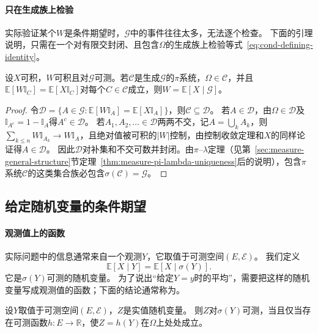 \paragraph{只在生成族上检验}
实际验证某个$W$是条件期望时，$\mathcal G$中的事件往往太多，无法逐个检查。
下面的引理说明，只需在一个对有限交封闭、且包含$\Omega$的生成族上检验等式~\eqref{eq:cond-defining-identity}。

\begin{lemma}[生成族上的检验]
\label{lem:cond-pi-check}
设$X$可积，$W$可积且对$\mathcal G$可测。若$\mathcal C$是生成$\mathcal G$的$\pi$系统，$\Omega\in\mathcal C$，并且$\mathbb E[W\mathbb I_C]=\mathbb E[X\mathbb I_C]$对每个$C\in\mathcal C$成立，则$W=\mathbb E[X\mid\mathcal G]$。
\end{lemma}

\begin{proof}
令$\mathcal D=\{A\in\mathcal G:\mathbb E[W\mathbb I_A]=\mathbb E[X\mathbb I_A]\}$，则$\mathcal C\subseteq\mathcal D$。
若$A\in\mathcal D$，由$\Omega\in\mathcal D$及$\mathbb I_{A^c}=1-\mathbb I_A$得$A^c\in\mathcal D$。
若$A_1,A_2,\ldots\in\mathcal D$两两不交，记$A=\bigcup_kA_k$，则$\sum_{k\leq n}W\mathbb I_{A_k}\to W\mathbb I_A$，且绝对值被可积的$|W|$控制，由控制收敛定理和$X$的同样论证得$A\in\mathcal D$。
因此$\mathcal D$对补集和不交可数并封闭。由$\pi$--$\lambda$定理（见第~\ref{sec:measure-general-structure}节定理~\ref{thm:measure-pi-lambda-uniqueness}后的说明），包含$\pi$系统$\mathcal C$的这类集合族必包含$\sigma(\mathcal C)=\mathcal G$。
\end{proof}

\subsection{给定随机变量的条件期望}

\paragraph{观测值上的函数}
实际问题中的信息通常来自一个观测$Y$，它取值于可测空间$(E,\mathcal E)$。
我们定义
\[
  \mathbb E[X\mid Y]=\mathbb E[X\mid\sigma(Y)].
\]
它是$\sigma(Y)$可测的随机变量。
为了说出“给定$Y=y$时的平均”，需要把这样的随机变量写成观测值的函数；下面的结论通常称为。

\begin{theorem}
\label{thm:cond-doob-dynkin}
设$Y$取值于可测空间$(E,\mathcal E)$，$Z$是实值随机变量。
则$Z$对$\sigma(Y)$可测，当且仅当存在可测函数$h:E\to\mathbb R$，使$Z=h(Y)$在$\Omega$上处处成立。
\end{theorem}

